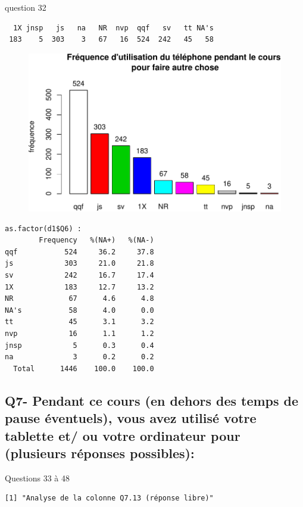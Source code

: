 \documentclass[]{article}
\begin{document}
question 32

\begin{verbatim}
  1X jnsp   js   na   NR  nvp  qqf   sv   tt NA's 
 183    5  303    3   67   16  524  242   45   58 
\end{verbatim}

\begin{figure}[htbp]
\centering
\includegraphics{qs_etudiants_files/figure-latex/utilisation2-1.pdf}
\end{figure}

\begin{verbatim}
as.factor(d1$Q6) : 
        Frequency   %(NA+)   %(NA-)
qqf           524     36.2     37.8
js            303     21.0     21.8
sv            242     16.7     17.4
1X            183     12.7     13.2
NR             67      4.6      4.8
NA's           58      4.0      0.0
tt             45      3.1      3.2
nvp            16      1.1      1.2
jnsp            5      0.3      0.4
na              3      0.2      0.2
  Total      1446    100.0    100.0
\end{verbatim}

\subsection{Q7- Pendant ce cours (en dehors des temps de pause
éventuels), vous avez utilisé votre tablette et/ ou votre ordinateur
pour (plusieurs réponses
possibles):}\label{q7--pendant-ce-cours-en-dehors-des-temps-de-pause-eventuels-vous-avez-utilise-votre-tablette-et-ou-votre-ordinateur-pour-plusieurs-reponses-possibles}

Questions 33 à 48

\begin{verbatim}
[1] "Analyse de la colonne Q7.13 (réponse libre)"
\end{verbatim}
\end{document}
